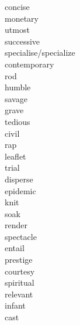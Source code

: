 \documentclass[a4paper, 11pt]{ctexart}
\begin{document}
\begin{multicols*}{3}
\begin{description}
\item[concise]

\item[monetary]

\item[utmost]

\item[successive]

\item[specialise/specialize]

\item[contemporary]

\item[rod]

\item[humble]

\item[savage]

\item[grave]

\item[tedious]

\item[civil]

\item[rap]

\item[leaflet]

\item[trial]

\item[disperse]

\item[epidemic]

\item[knit]

\item[soak]

\item[render]

\item[spectacle]

\item[entail]

\item[prestige]

\item[courtesy]

\item[spiritual]

\item[relevant]

\item[infant]

\item[cast]


\end{description}
\end{multicols*}
\end{document}

